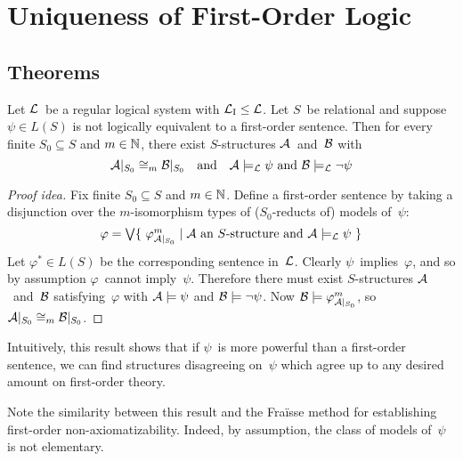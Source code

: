 %
%
%
\section{Uniqueness of First-Order Logic}
\subsection*{Theorems}
\begin{lem}
Let \(\mathcal{L}\)~be a regular logical system with \(\mathcal{L}_{\mathrm{I}}\le\mathcal{L}\). Let \(S\)~be relational and suppose \(\psi\in L(S)\) is not logically equivalent to a first-order sentence. Then for every finite \(S_0\subseteq S\) and \(m\in\mathbb{N}\), there exist \(S\)-structures \(\mathcal{A}\)~and~\(\mathcal{B}\) with
\[\mathcal{A}|_{S_0}\cong_m\mathcal{B}|_{S_0}\quad\text{and}\quad\mathcal{A}\models_{\mathcal{L}}\psi\text{ and }\mathcal{B}\models_{\mathcal{L}}\lnot\psi\]
\end{lem}
\begin{proof}[Proof idea]
Fix finite \(S_0\subseteq S\) and \(m\in\mathbb{N}\). Define a first-order sentence by taking a disjunction over the \(m\)-isomorphism types of (\(S_0\)-reducts of) models of~\(\psi\):
\[\varphi=\biglor\{\ \varphi_{\A|_{S_0}}^m\mid\A\text{ an }S\text{-structure and }\A\models_{\L}\psi\ \}\]
Let \(\varphi^*\in L(S)\) be the corresponding sentence in~\(\mathcal{L}\). Clearly \(\psi\)~implies~\(\varphi\), and so by assumption \(\varphi\)~cannot imply~\(\psi\). Therefore there must exist \(S\)-structures \(\mathcal{A}\)~and~\(\mathcal{B}\) satisfying~\(\varphi\) with \(\mathcal{A}\models\psi\) and \(\mathcal{B}\models\lnot\psi\). Now \(\mathcal{B}\models\varphi_{\mathcal{A}|_{S_0}}^m\), so \(\mathcal{A}|_{S_0}\cong_m\mathcal{B}|_{S_0}\).
\end{proof}
\begin{rmk}
Intuitively, this result shows that if \(\psi\)~is more powerful than a first-order sentence, we can find structures disagreeing on~\(\psi\) which agree up to any desired amount on first-order theory.

Note the similarity between this result and the Fra\"isse method for establishing first-order non-axiomatizability. Indeed, by assumption, the class of models of~\(\psi\) is not elementary.
\end{rmk}

